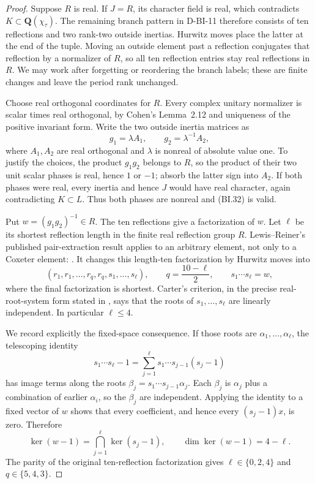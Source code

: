 \begin{proof}
Suppose $R$ is real.  If $J=R$, its character field is real, which
contradicts $K\subset\mathbf Q(\chi_\tau)$.  The remaining branch
pattern in D-BI-11 therefore consists of ten reflections and two
rank-two outside inertias.  Hurwitz moves place the latter at the
end of the tuple.  Moving an outside element past a reflection
conjugates that reflection by a normalizer of $R$, so all ten
reflection entries stay real reflections in $R$.  We may work after
forgetting or reordering the branch labels; these are finite changes
and leave the period rank unchanged.

Choose real orthogonal coordinates for $R$.  Every complex unitary
normalizer is scalar times real orthogonal, by Cohen's Lemma~2.12
and uniqueness of the positive invariant form.  Write the two
outside inertia matrices as
\[
                   g_1=\lambda A_1,\qquad
                   g_2=\lambda^{-1}A_2,                      \tag{BI.32}
\]
where $A_1,A_2$ are real orthogonal and $\lambda$ is nonreal of
absolute value one.  To justify the choices, the product $g_1g_2$
belongs to $R$, so the product of their two unit scalar phases is
real, hence $1$ or $-1$; absorb the latter sign into $A_2$.
If both phases were real, every inertia and hence $J$ would have
real character, again contradicting $K\subset L$.  Thus both
phases are nonreal and (BI.32) is valid.

Put $w=(g_1g_2)^{-1}\in R$.  The ten reflections give a
factorization of $w$.  Let $\ell$ be its shortest reflection length
in the finite real reflection group $R$.  Lewis--Reiner's published
pair-extraction result applies to an arbitrary element, not only
to a Coxeter element:
\cite[Corollary~1.4, p.~1459; proof \S4.3, pp.~1480--1481]{BI:LR}.
It changes this length-ten factorization by Hurwitz moves into
\[
 (r_1,r_1,\ldots,r_q,r_q,s_1,\ldots,s_\ell),
 \qquad q=\frac{10-\ell}{2},\qquad s_1\cdots s_\ell=w,
                                                               \tag{BI.33}
\]
where the final factorization is shortest.  Carter's criterion,
in the precise real-root-system form stated in
\cite[Proposition~4.1, p.~1473]{BI:LR}, says that the roots of
$s_1,\ldots,s_\ell$ are linearly independent.  In particular
$\ell\le4$.

We record explicitly the fixed-space consequence.  If those roots
are $\alpha_1,\ldots,\alpha_\ell$, the telescoping identity
\[
 s_1\cdots s_\ell-1
       =\sum_{j=1}^{\ell}s_1\cdots s_{j-1}(s_j-1)
\]
has image terms along the roots
$\beta_j=s_1\cdots s_{j-1}\alpha_j$.
Each $\beta_j$ is $\alpha_j$ plus a combination of earlier
$\alpha_i$, so the $\beta_j$ are independent.  Applying the
identity to a fixed vector of $w$ shows that every coefficient,
and hence every $(s_j-1)x$, is zero.  Therefore
\[
 \ker(w-1)=\bigcap_{j=1}^{\ell}\ker(s_j-1),\qquad
                \dim\ker(w-1)=4-\ell.                      \tag{BI.34}
\]
The parity of the original ten-reflection factorization gives
$\ell\in\{0,2,4\}$ and $q\in\{5,4,3\}$.


\end{proof}

